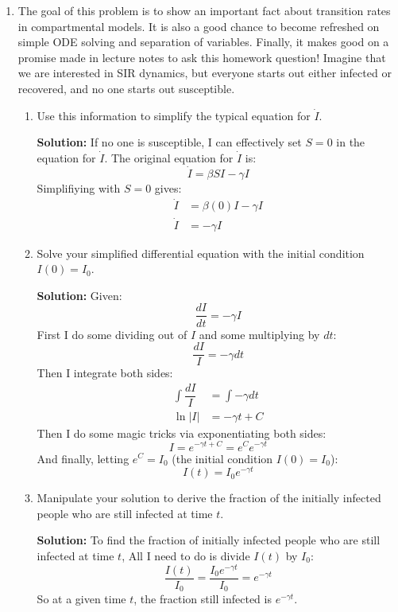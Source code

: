 \documentclass[11pt]{article}
\newenvironment{solution}{\par\noindent\begingroup\color{BrickRed}\textbf{Solution:} }{\par\endgroup}
\begin{document}
\begin{enumerate}
\clearpage

\item The goal of this problem is to show an important fact about transition rates in compartmental models.
	  It is also a good chance to become refreshed on simple ODE solving and separation of variables.
	  Finally, it makes good on a promise made in lecture notes to ask this homework question!
	  Imagine that we are interested in SIR dynamics,
	  but everyone starts out either infected or recovered,
	  and no one starts out susceptible.
\begin{enumerate}[label=\alph*.]
	\item Use this information to simplify the typical equation for $\dot{I}$.
		\begin{solution} \newline
		If no one is susceptible, I can effectively set $S=0$ in the equation for $\dot{I}$.
		The original equation for $\dot{I}$ is: 
		$$\dot{I} = \beta S I - \gamma I$$
		Simplifiying with $S=0$ gives:
			\begin{align*}
			\dot{I} &= \beta (0) I - \gamma I \\
			\dot{I} &= - \gamma I
			\end{align*}
		\end{solution}

	\item Solve your simplified differential equation with the initial condition $I(0) = I_0$.
		\begin{solution} \newline
			Given:
			$$\dfrac{dI}{dt} = -\gamma I$$
			First I do some dividing out of $I$ and some multiplying by $dt$:
			$$\dfrac{dI}{I} = -\gamma dt$$
			Then I integrate both sides:
			\begin{align*}
			\int \dfrac{dI}{I} &= \int -\gamma dt \\
			\ln|I| &= -\gamma t + C
			\end{align*}
			Then I do some magic tricks via exponentiating both sides:
			$$I = e^{-\gamma t + C} = e^C e^{-\gamma t}$$
			And finally, letting $e^C = I_0$ (the initial condition $I(0) = I_0$):
			$$I(t) = I_0 e^{-\gamma t}$$
		\end{solution}

	\item Manipulate your solution to derive the fraction of the initially infected people who are still infected at time $t$.
		\begin{solution} \newline \newline
			To find the fraction of initially infected people who are still infected at time $t$,
			All I need to do is divide $I(t)$ by $I_0$:
			$$\frac{I(t)}{I_0} = \frac{I_0 e^{-\gamma t}}{I_0} = e^{-\gamma t}$$
			So at a given time $t$, the fraction still infected is $e^{-\gamma t}$.
		\end{solution}


\end{enumerate}
\end{enumerate}
\end{document}
